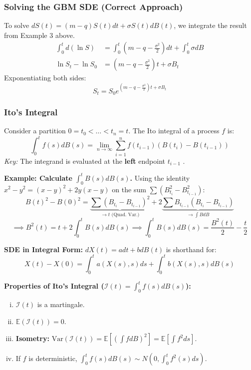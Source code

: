 \subsubsection*{Solving the GBM SDE (Correct Approach)}
To solve $dS(t) = (m-q)S(t)dt + \sigma S(t)dB(t)$, we integrate the result from Example 3 above.
\begin{align*}
    \int_0^t d(\ln S) &= \int_0^t \left( m - q - \frac{\sigma^2}{2} \right) dt + \int_0^t \sigma dB \\
    \ln S_t - \ln S_0 &= \left( m - q - \frac{\sigma^2}{2} \right)t + \sigma B_t
\end{align*}
Exponentiating both sides:
\[ \boxed{S_t = S_0 e^{\left( m - q - \frac{\sigma^2}{2} \right)t + \sigma B_t}} \]

\subsubsection{Ito's Integral}
\begin{framed}
Consider a partition \(0 = t_0 < \dots < t_n = t\). The Ito integral of a process $f$ is:
\begin{equation*}
    \int_{0}^{t}f(s)dB(s) = \lim_{n \to \infty}\sum_{i=1}^{n}f(t_{i-1})(B(t_i) - B(t_{i-1}))
\end{equation*}
\textit{Key:} The integrand is evaluated at the \textbf{left} endpoint $t_{i-1}$ .
\end{framed}

\textbf{Example: Calculate $\int_0^t B(s) dB(s)$.}
Using the identity $x^2-y^2 = (x-y)^2 + 2y(x-y)$ on the sum $\sum (B_{t_i}^2 - B_{t_{i-1}}^2)$:
\[ B(t)^2 - B(0)^2 = \underbrace{\sum (B_{t_i} - B_{t_{i-1}})^2}_{\to t \text{ (Quad. Var.)}} + 2 \underbrace{\sum B_{t_{i-1}}(B_{t_i} - B_{t_{i-1}})}_{\to \int B dB} \]
\[ \implies B^2(t) = t + 2 \int_0^t B(s) dB(s) \implies \boxed{\int_0^t B(s) dB(s) = \frac{B^2(t)}{2} - \frac{t}{2}} \]

\textbf{SDE in Integral Form:}
$dX(t) = a dt + b dB(t)$ is shorthand for:
\[ X(t) - X(0) = \int_{0}^{t}a(X(s),s) ds + \int_{0}^{t}b(X(s),s)dB(s) \]

\textbf{Properties of Ito's Integral ($\mathcal{I}(t) = \int_{0}^{t} f(s)dB(s)$): }
\begin{enumerate}[i.]
    \item $\mathcal{I}(t)$ is a martingale.
    \item \(\mathbb{E}(\mathcal{I}(t)) = 0\).
    \item \textbf{Isometry:} \(\text{Var}(\mathcal{I}(t)) = \mathbb{E}[(\int f dB)^2] = \mathbb{E}[\int f^2 ds]\).
    \item If $f$ is deterministic, \(\int_{0}^{t}f(s)dB(s) \sim N(0, \int_{0}^{t}f^2(s)ds)\).
\end{enumerate}

